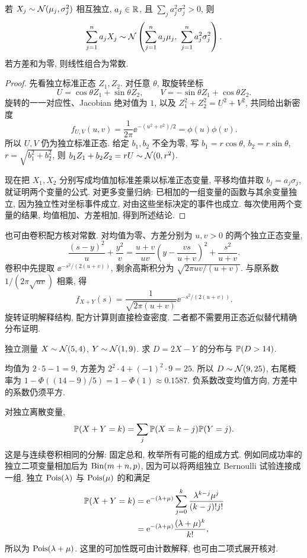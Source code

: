 \begin{theorem}[独立正态的线性组合]
若 $X_j\sim\mathcal N(\mu_j,\sigma_j^2)$ 相互独立, $a_j\in\mathbb R$, 且 $\sum_j a_j^2\sigma_j^2>0$, 则
\[
 \sum_{j=1}^n a_jX_j\sim
 \mathcal N\left(\sum_{j=1}^n a_j\mu_j,\ \sum_{j=1}^n a_j^2\sigma_j^2\right).
\]
若方差和为零, 则线性组合为常数.
\end{theorem}
\begin{proof}
先看独立标准正态 $Z_1,Z_2$. 对任意 $\theta$, 取旋转坐标
\[
 U=\cos\theta Z_1+\sin\theta Z_2,\qquad
 V=-\sin\theta Z_1+\cos\theta Z_2.
\]
旋转的一一对应性、Jacobian 绝对值为 $1$, 以及
$Z_1^2+Z_2^2=U^2+V^2$, 共同给出新密度
\[
 f_{U,V}(u,v)=\frac1{2\pi}\ee^{-(u^2+v^2)/2}=\phi(u)\phi(v).
\]
所以 $U,V$ 仍为独立标准正态. 给定 $b_1,b_2$ 不全为零, 写
$b_1=r\cos\theta$, $b_2=r\sin\theta$, $r=\sqrt{b_1^2+b_2^2}$, 则
$b_1Z_1+b_2Z_2=rU\sim\mathcal N(0,r^2)$.

现在把 $X_1,X_2$ 分别写成均值加标准差乘以标准正态变量, 平移均值并取 $b_j=a_j\sigma_j$, 就证明两个变量的公式. 对更多变量归纳: 已相加的一组变量的函数与其余变量独立, 因为独立性对坐标事件成立, 对由这些坐标决定的事件也成立. 每次使用两个变量的结果, 均值相加、方差相加, 得到所述结论.
\end{proof}

也可由卷积配方核对常数. 对均值为零、方差分别为 $u,v>0$ 的两个独立正态变量,
\[
 \frac{(s-y)^2}{u}+\frac{y^2}{v}
 =\frac{u+v}{uv}\left(y-\frac{vs}{u+v}\right)^2
   +\frac{s^2}{u+v}.
\]
卷积中先提取 $\ee^{-s^2/(2(u+v))}$, 剩余高斯积分为
$\sqrt{2\pi uv/(u+v)}$. 与原系数 $1/(2\pi\sqrt{uv})$ 相乘, 得
\[
 f_{X+Y}(s)=\frac1{\sqrt{2\pi(u+v)}}\ee^{-s^2/(2(u+v))}.
\]
旋转证明解释结构, 配方计算则直接检查密度. 二者都不需要用正态近似替代精确分布证明.

\begin{example}
独立测量 $X\sim\mathcal N(5,4)$, $Y\sim\mathcal N(1,9)$. 求 $D=2X-Y$ 的分布与 $\mathbb P(D>14)$.
\end{example}
\begin{solution}
均值为 $2\cdot5-1=9$, 方差为 $2^2\cdot4+(-1)^2\cdot9=25$. 所以
$D\sim\mathcal N(9,25)$, 右尾概率为 $1-\Phi((14-9)/5)=1-\Phi(1)\approx0.1587$.
负系数改变均值方向, 方差中的系数仍须平方.
\end{solution}


对独立离散变量,
\[
 \mathbb P(X+Y=k)=\sum_j\mathbb P(X=k-j)\mathbb P(Y=j).
\]
这是与连续卷积相同的分解: 固定总和, 枚举所有可能的组成方式. 例如同成功率的独立二项变量相加后为 $\operatorname{Bin}(m+n,p)$, 因为可以将两组独立 Bernoulli 试验连接成一组. 独立 $\operatorname{Pois}(\lambda)$ 与 $\operatorname{Pois}(\mu)$ 的和满足
\begin{align*}
 \mathbb P(X+Y=k)
 &=\mathrm e^{-(\lambda+\mu)}\sum_{j=0}^k
      \frac{\lambda^{k-j}\mu^j}{(k-j)!j!}\\
 &=\mathrm e^{-(\lambda+\mu)}\frac{(\lambda+\mu)^k}{k!},
\end{align*}
所以为 $\operatorname{Pois}(\lambda+\mu)$. 这里的可加性既可由计数解释, 也可由二项式展开核对.

